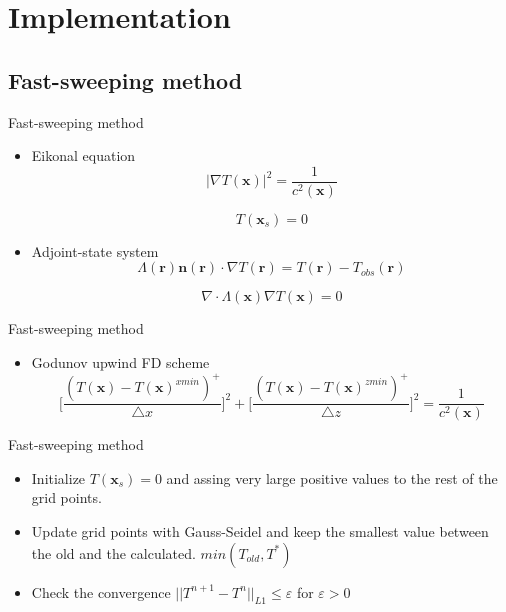 \documentclass{beamer}
\begin{document}
 \section{Implementation}
 
 \subsection{Fast-sweeping method}
 
 \begin{frame}{Fast-sweeping method}
  \begin{itemize}
   \item Eikonal equation
   \begin{equation}
    |\nabla T(\boldsymbol{x})|^2 =  \frac{1}{c^2(\boldsymbol{x})}
   \end{equation}
   
   \begin{equation}
    T(\boldsymbol{x}_s) = 0
   \end{equation}
   \item Adjoint-state system
   \begin{equation}
    \Lambda(\boldsymbol{r})\boldsymbol{n}(\boldsymbol{r})\cdot\nabla T(\boldsymbol{r}) = T(\boldsymbol{r}) - T_{obs}(\boldsymbol{r})
   \end{equation}
   
   \begin{equation}
    \nabla\cdot\Lambda(\boldsymbol{x})\nabla T(\boldsymbol{x}) = 0
   \end{equation}
  \end{itemize}
 \end{frame}

 \begin{frame}{Fast-sweeping method}
  \begin{itemize}
   \item Godunov upwind FD scheme
   \begin{equation}
    \bigg[\frac{(T(\boldsymbol{x})-T(\boldsymbol{x})^{xmin})^+}{\triangle x}\bigg]^2 + \bigg[\frac{(T(\boldsymbol{x})-T(\boldsymbol{x})^{zmin})^+}{\triangle z}\bigg]^2 = \frac{1}{c^2(\boldsymbol{x})} \nonumber
   \end{equation}
  \end{itemize}
 \end{frame}
 
 \begin{frame}{Fast-sweeping method}
  \begin{itemize}
   \item Initialize $T(\boldsymbol{x}_s) = 0$ and assing very large positive values to the rest of the grid points.
   
   \item Update grid points with Gauss-Seidel and keep the smallest value between the old and the calculated. $min(T_{old},T^*)$
  
   \item Check the convergence $||T^{n+1} - T^n||_{L1} \leq \varepsilon$ for $\varepsilon > 0$
   \end{itemize}
 \end{frame}
 
\end{document}
